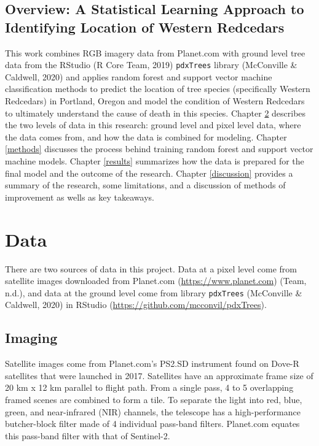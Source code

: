 \documentclass[12pt,twoside]{reedthesis}
\begin{document}
\hypertarget{overview-a-statistical-learning-approach-to-identifying-location-of-western-redcedars}{%
\section{Overview: A Statistical Learning Approach to Identifying Location of Western Redcedars}\label{overview-a-statistical-learning-approach-to-identifying-location-of-western-redcedars}}

This work combines RGB imagery data from Planet.com with ground level tree data from the RStudio (R Core Team, 2019) \texttt{pdxTrees} library (McConville \& Caldwell, 2020) and applies random forest and support vector machine classification methods to predict the location of tree species (specifically Western Redcedars) in Portland, Oregon and model the condition of Western Redcedars to ultimately understand the cause of death in this species. Chapter \ref{data} describes the two levels of data in this research: ground level and pixel level data, where the data comes from, and how the data is combined for modeling. Chapter \ref{methods} discusses the process behind training random forest and support vector machine models. Chapter \ref{results} summarizes how the data is prepared for the final model and the outcome of the research. Chapter \ref{discussion} provides a summary of the research, some limitations, and a discussion of methods of improvement as wells as key takeaways.

\hypertarget{data}{%
\chapter{Data}\label{data}}

There are two sources of data in this project. Data at a pixel level come from satellite images downloaded from Planet.com (\url{https://www.planet.com}) (Team, n.d.), and data at the ground level come from library \texttt{pdxTrees} (McConville \& Caldwell, 2020) in RStudio (\url{https://github.com/mcconvil/pdxTrees}).

\hypertarget{imaging}{%
\section{Imaging}\label{imaging}}

Satellite images come from Planet.com's PS2.SD instrument found on Dove-R satellites that were launched in 2017. Satellites have an approximate frame size of 20 km x 12 km parallel to flight path. From a single pass, 4 to 5 overlapping framed scenes are combined to form a tile. To separate the light into red, blue, green, and near-infrared (NIR) channels, the telescope has a high-performance butcher-block filter made of 4 individual pass-band filters. Planet.com equates this pass-band filter with that of Sentinel-2.
\end{document}
